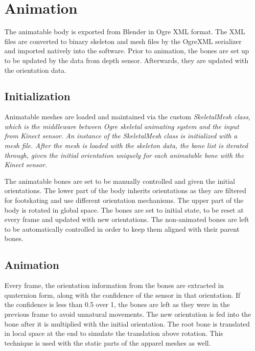 \chapter{Animation}
\label{chapter_animation}

The animatable body is exported from Blender in Ogre XML format. The XML files are converted to binary skeleton and mesh files by the OgreXML serializer and imported natively into the software. Prior to animation, the bones are set up to be updated by the data from depth sensor. Afterwards, they are updated with the orientation data.

\section{Initialization}
\label{section_animation_initialization}

Animatable meshes are loaded and maintained via the custom \em{SkeletalMesh} class, which is the middleware between Ogre skeletal animating system and the input from Kinect sensor. An instance of the \em{SkeletalMesh} class is initialized with a mesh file. After the mesh is loaded with the skeleton data, the bone list is iterated through, given the initial orientation uniquely for each animatable bone with the Kinect sensor. 

The animatable bones are set to be manually controlled and given the initial orientations. The lower part of the body inherits orientations as they are filtered for footskating and use different orientation mechanisms. The upper part of the body is rotated in global space. The bones are set to initial state, to be reset at every frame and updated with new orientations. The non-animated bones are left to be automatically controlled in order to keep them aligned with their parent bones. 

\section{Animation}
\label{section_animation}
Every frame, the orientation information from the bones are extracted in quaternion form, along with the confidence of the sensor in that orientation. If the confidence is less than 0.5 over 1, the bones are left as they were in the previous frame to avoid unnatural movements. The new orientation is fed into the bone after it is multiplied with the initial orientation. The root bone is translated in local space at the end to simulate the translation above rotation. This technique is used with the static parts of the apparel meshes as well. 

